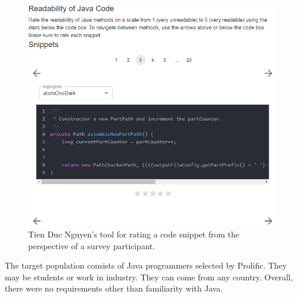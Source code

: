 \documentclass[%
class=scrreprt,
chapterprefix=false,%
open=right,%
twoside=true,%
paper=a4,%
logofile={Logo\_zentral\_farbig\_EN.png},%
thesistype=master,%
UKenglish,%
]{se2thesis}
\theoremstyle{definition}
\begin{document}
	\begin{figure}[tb]
		\centering
		\includegraphics[width=\textwidth]{img/survey_tool.png}
		\caption{Tien Duc Nguyen's tool for rating a code snippet from the perspective of a survey participant.}
		\label{fig:survey_tool}
	\end{figure}

	The target population consists of Java programmers selected by Prolific. They may be students or work in industry. They can come from any country. Overall, there were no requirements other than familiarity with Java.
	
	
	
\end{document}
